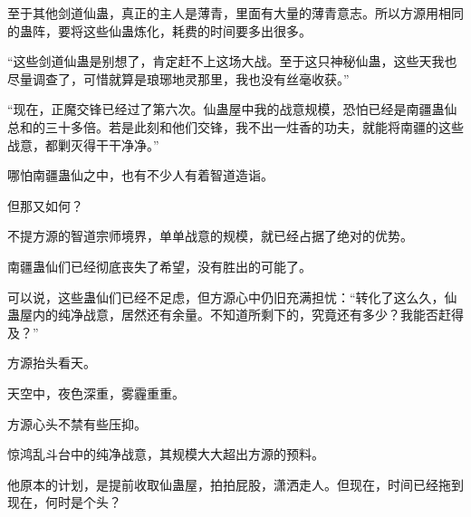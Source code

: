 \begin{this_body}
至于其他剑道仙蛊，真正的主人是薄青，里面有大量的薄青意志。所以方源用相同的蛊阵，要将这些仙蛊炼化，耗费的时间要多出很多。

“这些剑道仙蛊是别想了，肯定赶不上这场大战。至于这只神秘仙蛊，这些天我也尽量调查了，可惜就算是琅琊地灵那里，我也没有丝毫收获。”

“现在，正魔交锋已经过了第六次。仙蛊屋中我的战意规模，恐怕已经是南疆蛊仙总和的三十多倍。若是此刻和他们交锋，我不出一炷香的功夫，就能将南疆的这些战意，都剿灭得干干净净。”

哪怕南疆蛊仙之中，也有不少人有着智道造诣。

但那又如何？

不提方源的智道宗师境界，单单战意的规模，就已经占据了绝对的优势。

南疆蛊仙们已经彻底丧失了希望，没有胜出的可能了。

可以说，这些蛊仙们已经不足虑，但方源心中仍旧充满担忧：“转化了这么久，仙蛊屋内的纯净战意，居然还有余量。不知道所剩下的，究竟还有多少？我能否赶得及？”

方源抬头看天。

天空中，夜色深重，雾霾重重。

方源心头不禁有些压抑。

惊鸿乱斗台中的纯净战意，其规模大大超出方源的预料。

他原本的计划，是提前收取仙蛊屋，拍拍屁股，潇洒走人。但现在，时间已经拖到现在，何时是个头？

\end{this_body}

